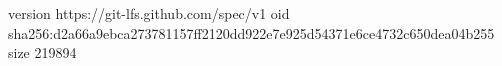 version https://git-lfs.github.com/spec/v1
oid sha256:d2a66a9ebca273781157ff2120dd922e7e925d54371e6ce4732c650dea04b255
size 219894
